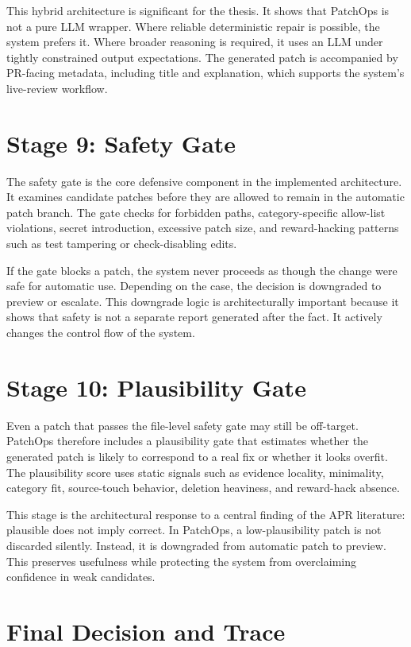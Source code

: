 This hybrid architecture is significant for the thesis. It shows that PatchOps is not a pure LLM wrapper. Where
reliable deterministic repair is possible, the system prefers it. Where broader reasoning is required, it uses
an LLM under tightly constrained output expectations. The generated patch is accompanied by PR-facing metadata,
including title and explanation, which supports the system's live-review workflow.

\section{Stage 9: Safety Gate}

The safety gate is the core defensive component in the implemented architecture. It examines candidate patches
before they are allowed to remain in the automatic patch branch. The gate checks for forbidden paths,
category-specific allow-list violations, secret introduction, excessive patch size, and reward-hacking patterns
such as test tampering or check-disabling edits.

If the gate blocks a patch, the system never proceeds as though the change were safe for automatic use.
Depending on the case, the decision is downgraded to preview or escalate. This downgrade logic is architecturally
important because it shows that safety is not a separate report generated after the fact. It actively changes
the control flow of the system.

\section{Stage 10: Plausibility Gate}

Even a patch that passes the file-level safety gate may still be off-target. PatchOps therefore includes a
plausibility gate that estimates whether the generated patch is likely to correspond to a real fix or whether it
looks overfit. The plausibility score uses static signals such as evidence locality, minimality, category fit,
source-touch behavior, deletion heaviness, and reward-hack absence.

This stage is the architectural response to a central finding of the APR literature: plausible does not imply
correct. In PatchOps, a low-plausibility patch is not discarded silently. Instead, it is downgraded from
automatic patch to preview. This preserves usefulness while protecting the system from overclaiming confidence
in weak candidates.

\section{Final Decision and Trace}

